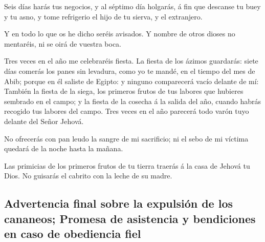  Seis días harás tus negocios, y al séptimo día holgarás, á
fin que descanse tu buey y tu asno, y tome refrigerio el hijo de tu
sierva, y el extranjero.

 Y en todo lo que os he dicho seréis avisados. Y nombre de
otros dioses no mentaréis, ni se oirá de vuestra boca.

 Tres veces en el año me celebraréis fiesta. 
La fiesta de los ázimos guardarás: siete días comerás los panes sin
levadura, como yo te mandé, en el tiempo del mes de Abib; porque en él
saliste de Egipto: y ninguno comparecerá vacío delante de mí:
 También la fiesta de la siega, los primeros frutos de tus
labores que hubieres sembrado en el campo; y la fiesta de la cosecha á
la salida del año, cuando habrás recogido tus labores del campo.
 Tres veces en el año parecerá todo varón tuyo delante del
Señor Jehová.

 No ofrecerás con pan leudo la sangre de mi sacrificio; ni
el sebo de mi víctima quedará de la noche hasta la mañana.

 Las primicias de los primeros frutos de tu tierra traerás
á la casa de Jehová tu Dios. No guisarás el cabrito con la leche de su
madre.

\hypertarget{advertencia-final-sobre-la-expulsiuxf3n-de-los-cananeos-promesa-de-asistencia-y-bendiciones-en-caso-de-obediencia-fiel}{%
\subsection{Advertencia final sobre la expulsión de los cananeos;
Promesa de asistencia y bendiciones en caso de obediencia
fiel}\label{advertencia-final-sobre-la-expulsiuxf3n-de-los-cananeos-promesa-de-asistencia-y-bendiciones-en-caso-de-obediencia-fiel}}

